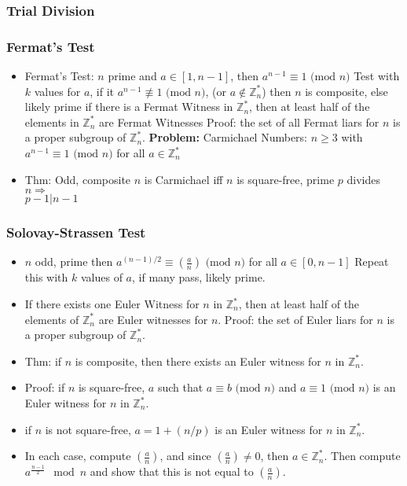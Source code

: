 \documentclass[12pt]{article}
\newcommand{\Z}{\mathbb{Z}}
\newcommand{\I}{\Rightarrow}
\newcommand{\modd}[1]{\text{ (mod } #1\text{)}}
\newcommand{\jac}[2]{\left( \frac{#1}{#2} \right)}
\begin{document}
\subsubsection{Trial Division}
\subsubsection{Fermat's Test}

\begin{itemize}
\item Fermat's Test: $n$ prime and $a \in [1,n-1]$, then $a^{n-1} \equiv 1 \modd n$
\subitem Test with $k$ values for $a$, if it $a^{n-1} \not\equiv 1 \modd n$, (or $a \notin \Z_n^*$) then $n$ is composite, else likely prime
\subitem if there is a Fermat Witness in $\Z_n^*$, then at least half of the elements in $\Z_n^*$ are Fermat Witnesses
\subsubitem Proof: the set of all Fermat liars for $n$ is a proper subgroup of $\Z_n^*$.
\subitem \textbf{Problem:} Carmichael Numbers: $n \ge 3$ with $a^{n-1} \equiv 1 \modd n$  for all $a \in \Z_n^*$
\item Thm: Odd, composite $n$ is Carmichael iff $n$ is square-free, prime $p$ divides $n \I$ \\$p-1|n-1$
\end{itemize}

\subsubsection{Solovay-Strassen Test}

\begin{itemize}
\item $n$ odd, prime then $a^{(n-1)/2} \equiv \jac{a}{n} \modd n$ for all $a \in [0,n-1]$
\subitem Repeat this with $k$ values of $a$, if many pass, likely prime.
\item If there exists one Euler Witness for $n$ in $\Z_n^*$, then at least half of the elements of $\Z_n^*$ are Euler witnesses for $n$.
\subitem Proof: the set of Euler liars for $n$ is a proper subgroup of $\Z_n^*$.
\item Thm: if $n$ is composite, then there exists an Euler witness for $n$ in $\Z_n^*$.
\item Proof: if $n$ is square-free, $a$ such that $a \equiv b \modd n$ and $a \equiv 1 \modd n$ is an Euler witness for $n$ in $\Z_n^*$.
\item if $n$ is not square-free, $a = 1+(n/p)$ is an Euler witness for $n$ in $\Z_n^*$.
\item In each case, compute $\jac{a}{n}$, and since $\jac{a}{n} \ne 0$, then $a \in \Z_n^*$. Then compute $a^{\frac{n-1}{2}} \mod n$ and show that this is not equal to $\jac{a}{n}$.
\end{itemize}
\end{document}
